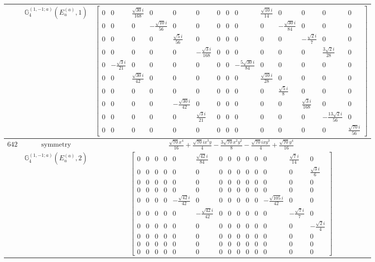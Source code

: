 \documentclass[fleqn,8pt,landscape]{jsarticle}
\begin{document}
\begin{longtable}{ccc}
$  $ & $ \mathbb{G}_{4}^{(1,-1;a)}(E_{u}^{(a)},1) $ & $ \begin{bmatrix} 0 & 0 & \frac{\sqrt{30} i}{168} & 0 & 0 & 0 & 0 & 0 & 0 & \frac{\sqrt{10} i}{14} & 0 & 0 & 0 & 0 \\ 0 & 0 & 0 & - \frac{\sqrt{10} i}{56} & 0 & 0 & 0 & 0 & 0 & 0 & - \frac{\sqrt{30} i}{84} & 0 & 0 & 0 \\ 0 & 0 & 0 & 0 & \frac{\sqrt{5} i}{56} & 0 & 0 & 0 & 0 & 0 & 0 & - \frac{\sqrt{2} i}{7} & 0 & 0 \\ 0 & 0 & 0 & 0 & 0 & - \frac{\sqrt{3} i}{168} & 0 & 0 & 0 & 0 & 0 & 0 & \frac{3 \sqrt{2} i}{28} & 0 \\ 0 & - \frac{\sqrt{3} i}{21} & 0 & 0 & 0 & 0 & 0 & 0 & - \frac{5 \sqrt{30} i}{84} & 0 & 0 & 0 & 0 & 0 \\ 0 & 0 & \frac{\sqrt{30} i}{42} & 0 & 0 & 0 & 0 & 0 & 0 & \frac{\sqrt{10} i}{28} & 0 & 0 & 0 & 0 \\ 0 & 0 & 0 & 0 & 0 & 0 & 0 & 0 & 0 & 0 & \frac{\sqrt{5} i}{8} & 0 & 0 & 0 \\ 0 & 0 & 0 & 0 & - \frac{\sqrt{30} i}{42} & 0 & 0 & 0 & 0 & 0 & 0 & \frac{\sqrt{3} i}{168} & 0 & 0 \\ 0 & 0 & 0 & 0 & 0 & \frac{\sqrt{3} i}{21} & 0 & 0 & 0 & 0 & 0 & 0 & - \frac{13 \sqrt{2} i}{56} & 0 \\ 0 & 0 & 0 & 0 & 0 & 0 & 0 & 0 & 0 & 0 & 0 & 0 & 0 & \frac{\sqrt{70} i}{56} \end{bmatrix} $ \\ \hline
$ 642 $ & $ \text{symmetry} $ & $ \frac{\sqrt{70} x^{4}}{16} + \frac{\sqrt{70} i x^{3} y}{4} - \frac{3 \sqrt{70} x^{2} y^{2}}{8} - \frac{\sqrt{70} i x y^{3}}{4} + \frac{\sqrt{70} y^{4}}{16} $ \\
$  $ & $ \mathbb{G}_{4}^{(1,-1;a)}(E_{u}^{(a)},2) $ & $ \begin{bmatrix} 0 & 0 & 0 & 0 & 0 & \frac{\sqrt{42} i}{84} & 0 & 0 & 0 & 0 & 0 & 0 & \frac{\sqrt{7} i}{14} & 0 \\ 0 & 0 & 0 & 0 & 0 & 0 & 0 & 0 & 0 & 0 & 0 & 0 & 0 & \frac{\sqrt{3} i}{6} \\ 0 & 0 & 0 & 0 & 0 & 0 & 0 & 0 & 0 & 0 & 0 & 0 & 0 & 0 \\ 0 & 0 & 0 & 0 & 0 & 0 & 0 & 0 & 0 & 0 & 0 & 0 & 0 & 0 \\ 0 & 0 & 0 & 0 & - \frac{\sqrt{42} i}{42} & 0 & 0 & 0 & 0 & 0 & 0 & - \frac{\sqrt{105} i}{42} & 0 & 0 \\ 0 & 0 & 0 & 0 & 0 & - \frac{\sqrt{42} i}{42} & 0 & 0 & 0 & 0 & 0 & 0 & - \frac{\sqrt{7} i}{7} & 0 \\ 0 & 0 & 0 & 0 & 0 & 0 & 0 & 0 & 0 & 0 & 0 & 0 & 0 & - \frac{\sqrt{2} i}{4} \\ 0 & 0 & 0 & 0 & 0 & 0 & 0 & 0 & 0 & 0 & 0 & 0 & 0 & 0 \\ 0 & 0 & 0 & 0 & 0 & 0 & 0 & 0 & 0 & 0 & 0 & 0 & 0 & 0 \\ 0 & 0 & 0 & 0 & 0 & 0 & 0 & 0 & 0 & 0 & 0 & 0 & 0 & 0 \end{bmatrix} $ \\ \hline

\end{longtable}
\end{document}
